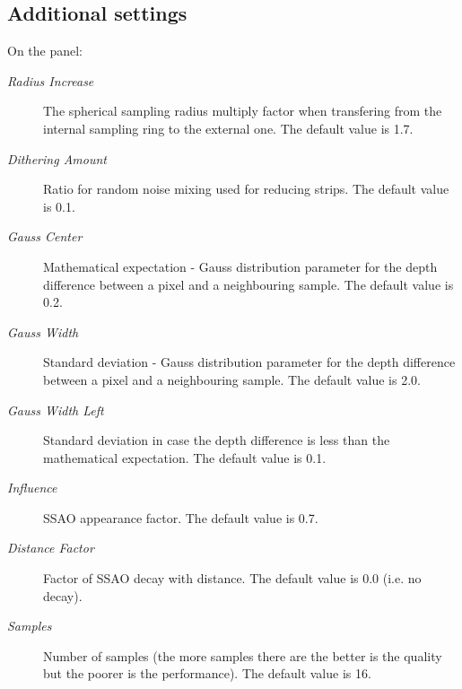 \documentclass[a4paper,12pt,oneside]{sphinxmanual}
\begin{document}
\subsection{Additional settings}
\label{postprocessing_effects:id10}
On the  panel:
\begin{description}
\item[{\emph{Radius Increase}}] \leavevmode
The spherical sampling radius multiply factor when transfering from the internal sampling ring to the external one. The default value is 1.7.

\item[{\emph{Dithering Amount}}] \leavevmode
Ratio for random noise mixing used for reducing strips. The default value is 0.1.

\item[{\emph{Gauss Center}}] \leavevmode
Mathematical expectation - Gauss distribution parameter for the depth difference between a pixel and a neighbouring sample. The default value is 0.2.

\item[{\emph{Gauss Width}}] \leavevmode
Standard deviation - Gauss distribution parameter for the depth difference between a pixel and a neighbouring sample. The default value is 2.0.

\item[{\emph{Gauss Width Left}}] \leavevmode
Standard deviation in case the depth difference is less than the mathematical expectation. The default value is 0.1.

\item[{\emph{Influence}}] \leavevmode
SSAO appearance factor. The default value is 0.7.

\item[{\emph{Distance Factor}}] \leavevmode
Factor of SSAO decay with distance. The default value is 0.0 (i.e. no decay).

\item[{\emph{Samples}}] \leavevmode
Number of samples (the more samples there are the better is the quality but the poorer is the performance). The default value is 16.

\end{description}
\end{document}
